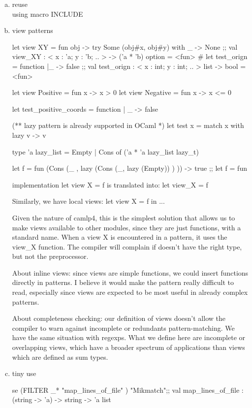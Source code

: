 \begin{enumerate}
\begin{enumerate}[(a)]
\item reuse \\ 
  using macro INCLUDE 

\item view patterns
  
  \begin{ocamlcode}
let view XY = fun obj -> try Some (obj#x, obj#y) with _ -> None ;;
val view_XY : < x : 'a; y : 'b; .. > -> ('a * 'b) option = <fun>
# let test_orign = function 
  |_ -> false 
;;
      val test_orign : < x : int; y : int; .. > list -> bool = <fun>    


let view Positive = fun x -> x > 0 
let view Negative = fun x -> x <= 0 

let test_positive_coords = function 
  | _ -> false

  (** lazy pattern is already supported in OCaml *)
let test x = match x with 
    lazy v -> v

type 'a lazy_list = Empty | Cons of ('a * 'a lazy_list lazy_t)
    

let f = fun (Cons (_ , lazy (Cons (_, lazy (Empty)) ) )) -> true ;;
let f = fun %
\end{ocamlcode}


implementation 
let view X = f is translated into:
   let view\_X = f

Similarly, we have local views:
let view X = f in ...

Given the nature of camlp4, this is the simplest solution that allows us to make views available to other modules, since they are just functions, with a standard name. When a view X is encountered in a pattern, it uses the view\_X function. The compiler will complain if doesn't have the right type, but not the preprocessor.

About inline views: since views are simple functions, we could insert functions directly in patterns. I believe it would make the pattern really difficult to read, especially since views are expected to be most useful in already complex patterns.


About completeness checking: our definition of views doesn't allow the compiler to warn against incomplete or redundants pattern-matching. We have the same situation with regexps. What we define here are incomplete or overlapping views, which have a broader spectrum of applications than views which are defined as sum types.

\item tiny use
  \begin{alternate}
  se (FILTER _* "map_lines_of_file" ) "Mikmatch";;
  val map_lines_of_file : (string -> 'a) -> string -> 'a list    
  \end{alternate}



\end{enumerate}
\end{enumerate}
